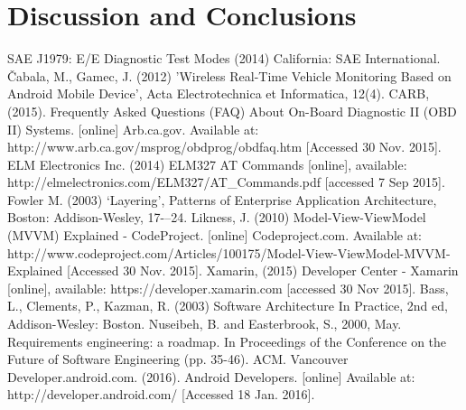 \documentclass[12pt]{report}
\begin{document}
	\chapter{Discussion and Conclusions}
				
	\newpage	
		
	\begin{thebibliography}{10}
		 SAE J1979:  E/E Diagnostic Test Modes (2014) California: SAE International.		
		 {\v C}abala, M., Gamec, J. (2012) 'Wireless Real-Time Vehicle Monitoring Based on Android Mobile Device', Acta Electrotechnica et Informatica, 12(4).
		 CARB, (2015). Frequently Asked Questions (FAQ) About On-Board Diagnostic II (OBD II) Systems. [online] Arb.ca.gov. Available at: http://www.arb.ca.gov/msprog/obdprog/obdfaq.htm [Accessed 30 Nov. 2015].
		 ELM Electronics Inc. (2014) ELM327 AT Commands [online], available: 	http://elmelectronics.com/ELM327/AT{\_}Commands.pdf [accessed 7 Sep 2015].
		 Fowler M. (2003) ‘Layering’, Patterns of Enterprise
	Application Architecture, Boston: Addison-Wesley, 17{-–}24.
		 Likness, J. (2010) Model-View-ViewModel (MVVM) Explained - CodeProject. [online] Codeproject.com. Available at: http://www.codeproject.com/Articles/100175/Model-View-ViewModel-MVVM-Explained [Accessed 30 Nov. 2015].
		 Xamarin, (2015) Developer Center - Xamarin [online], available: https://developer.xamarin.com [accessed 30 Nov 2015].
		 Bass, L., Clements, P., Kazman, R. (2003) Software Architecture In Practice, 2nd ed, Addison-Wesley: Boston.
		 Nuseibeh, B. and Easterbrook, S., 2000, May. Requirements engineering: a roadmap. In Proceedings of the Conference on the Future of Software Engineering (pp. 35-46). ACM.
Vancouver
		 Developer.android.com. (2016). Android Developers. [online] Available at: http://developer.android.com/ [Accessed 18 Jan. 2016].

	\end{thebibliography}	
	\newpage
\end{document}
